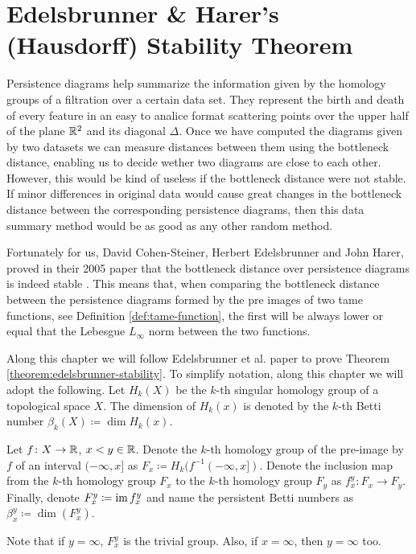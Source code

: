 \chapter{Edelsbrunner \& Harer's (Hausdorff) Stability Theorem}

Persistence diagrams help summarize the information given by the homology groups of a filtration over a certain data set. They represent the birth and death of every feature in an easy to analice format scattering points over the upper half of the plane $\mathbb R^2 $ and its diagonal $ \Delta $. Once we have computed the diagrams given by two datasets we can measure distances between them using the bottleneck distance, enabling us to decide wether two diagrams are close to each other. However, this would be kind of useless if the bottleneck distance were not stable. If minor differences in original data would cause great changes in the bottleneck distance between the corresponding persistence diagrams, then this data summary method would be as good as any other random method.

Fortunately for us, David Cohen-Steiner, Herbert Edelsbrunner and John Harer, proved in their 2005 paper that the bottleneck distance over persistence diagrams is indeed stable \cite{Edelsbrunner}. This means that, when comparing the bottleneck distance between the persistence diagrams formed by the pre images of two tame functions, see Definition \ref{def:tame-function}, the first will be always lower or equal that the Lebesgue $L_\infty$ norm between the two functions.

Along this chapter we will follow Edelsbrunner et al. paper \cite{Edelsbrunner} to prove Theorem \ref{theorem:edelsbrunner-stability}. To simplify notation, along this chapter we will adopt the following. Let $ H_k(X) $ be the $k$-th singular homology group of a topological space $ X $. The dimension of $ H_k(x) $ is denoted by the $k$-th Betti number $ \beta_k(X) \coloneq \dim H_k(x) $.

Let $ f\colon X \to \mathbb R $, $x < y \in \mathbb R$. Denote the $k$-th homology group of the pre-image by $ f $ of an interval $ (-\infty, x] $ as $ F_x \coloneq H_k(f^{-1}(-\infty, x])$. Denote the inclusion map from the $k$-th homology group $ F_x$ to the  $k$-th homology group $ F_y$ as $f_x^y \colon F_x \to F_y $. Finally, denote $ F_x^y \coloneq \operatorname{im} f_x^y $ and name the persistent Betti numbers as $ \beta_x^y \coloneq \dim(F_x^y) $.

Note that if $ y = \infty $, $ F_x^y $ is the trivial group. Also, if $ x = \infty $, then $ y = \infty $ too. 


